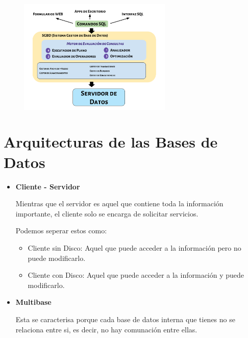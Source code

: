 \documentclass[12pt, fleqn]{report}                             %
\theoremstyle{break}                                            %
\begin{document}
            \begin{figure}[h!]
                \centering
                \includegraphics[width=0.65\textwidth]{ArquitecturaSGBD.pdf}
            \end{figure}







        \clearpage
        \section{Arquitecturas de las Bases de Datos}


            \begin{itemize}

                \item
                    \textbf{Cliente - Servidor}

                    Mientras que el servidor es aquel que contiene toda la información 
                    importante, el cliente solo se encarga de solicitar servicios.

                    Podemos seperar estos como:
                    \begin{itemize}
                        \item Cliente sin Disco:
                            Aquel que puede acceder a la información pero no puede modificarlo.

                        \item Cliente con Disco:
                            Aquel que puede acceder a la información y puede modificarlo.
                     \end{itemize} 


                \item
                    \textbf{Multibase}

                    Esta se caracterisa porque cada base de datos interna que tienes no se relaciona
                    entre si, es decir, no hay comunación entre ellas.

                        
            \end{itemize}
\end{document}
